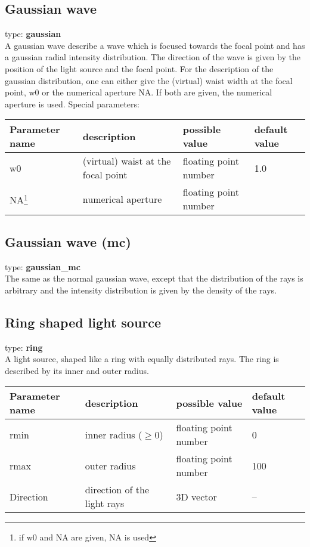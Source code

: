 \documentclass[a4paper,html,11pt,openany]{book}
\begin{document}
\subsection{Gaussian wave}
 type: \textbf{gaussian} \\
A gaussian wave describe a wave which is focused  towards the focal point and has a gaussian radial intensity distribution. The direction of the wave is given by the position of the light source and the focal point. For the description of the gaussian distribution, one can either give the (virtual) waist width at the focal point, w0 or the numerical aperture NA. If both are given, the numerical aperture is used. Special parameters:

\vspace{1em}
\begin{tabular}{p{2cm}|p{4cm}|p{4cm}|p{1cm}}
 Parameter name & description  & possible value & default value \\
 \hline
 w0 & (virtual) waist at the focal point & floating point number & 1.0 \\
 \hline
 NA\footnote{if w0 and NA are given, NA is used} & numerical aperture & floating point number \\ 
 \end{tabular}

\subsection{Gaussian wave (mc)} 
 type: \textbf{gaussian\_mc} \\
The same as the normal gaussian wave, except that the distribution of the rays is arbitrary and the intensity distribution is given by the density of the rays. 

\subsection{Ring shaped light source}
type: \textbf{ring} \\
A light source, shaped like a ring with equally distributed rays. The ring is described by its inner and outer radius. 

\vspace{1em}
 \begin{tabular}{p{2cm}|p{4cm}|p{4cm}|p{1cm}}
 Parameter name & description  & possible value & default value\\
 \hline
  rmin & inner radius ($\ge 0$) & floating point number & 0\\
  \hline
  rmax & outer radius  & floating point number & 100 \\
  \hline 
  Direction & direction of the light rays & 3D vector & --
\end{tabular} 
 
\end{document}
